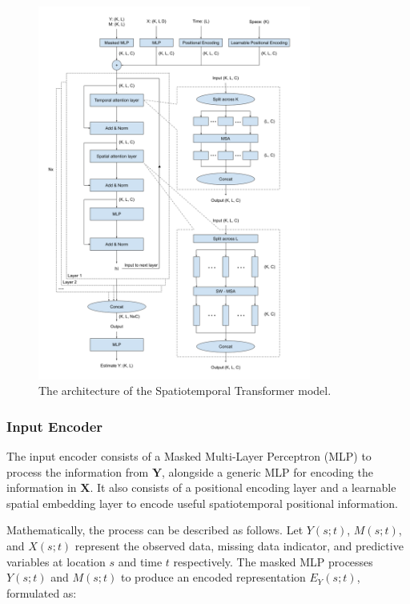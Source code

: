\documentclass[11pt]{article}
\begin{document}
\begin{figure}
\centering
\includegraphics[width=0.8\textwidth]{figure/st_transformer.png}
\caption{The architecture of the Spatiotemporal Transformer model.}
\label{fig: st_transformer}
\end{figure}




\subsubsection*{Input Encoder} 
The input encoder consists of a Masked Multi-Layer Perceptron (MLP) to process the information from $\boldsymbol{Y}$, alongside a generic MLP for encoding the information in $\boldsymbol{X}$. It also consists of a positional encoding layer and a learnable spatial embedding layer to encode useful spatiotemporal positional information.


Mathematically, the process can be described as follows. Let $Y(s;t)$, $M(s;t)$, and $X(s;t)$ represent the observed data, missing data indicator, and predictive variables at location $s$ and time $t$ respectively. The masked MLP processes $Y(s;t)$ and $M(s;t)$ to produce an encoded representation $E_{Y}(s;t)$, formulated as: 
\end{document}
